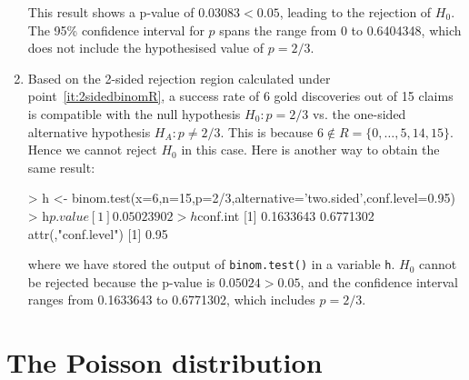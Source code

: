 \begin{enumerate}
This result shows a p-value of $0.03083<0.05$, leading to the
rejection of $H_0$. The 95\% confidence interval for $p$ spans the
range from 0 to 0.6404348, which does not include the hypothesised
value of $p=2/3$.

\item Based on the 2-sided rejection region calculated under
  point~\ref{it:2sidedbinomR}, a success rate of 6 gold discoveries
  out of 15 claims is compatible with the null hypothesis $H_0:
  p=2/3$ vs.  the one-sided alternative hypothesis $H_{\!A}:
  p\neq{2/3}$. This is because $6 \notin
  R=\{0,\ldots,5,14,15\}$. Hence we cannot reject $H_0$ in this
  case.  Here is another way to obtain the same result:

\begin{console}
> h <- binom.test(x=6,n=15,p=2/3,alternative='two.sided',conf.level=0.95)
> h$p.value
[1] 0.05023902
> h$conf.int
[1] 0.1633643 0.6771302
attr(,"conf.level")
[1] 0.95
\end{console}

\noindent where we have stored the output of
\texttt{binom.test()} in a variable \texttt{h}. $H_0$
cannot be rejected because the p-value is $0.05024>0.05$, and the
confidence interval ranges from 0.1633643 to 0.6771302, which includes
$p=2/3$.

\end{enumerate}

\section{The Poisson distribution}
\label{sec:R-poisson}

